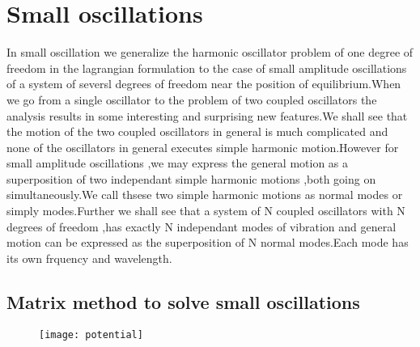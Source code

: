 \section{Small oscillations}
In small oscillation we generalize the harmonic oscillator problem of one degree of freedom in the lagrangian formulation to the case of small amplitude oscillations of a system of seversl degrees of freedom near the position of equilibrium.When we go from a single oscillator to the problem of two coupled oscillators the analysis results in some interesting and surprising new features.We shall see that the motion of the two coupled oscillators in general is much complicated and none of the oscillators in general executes simple harmonic motion.However for small amplitude oscillations ,we may express the general motion as a superposition of two independant simple harmonic motions ,both going on simultaneously.We call thsese two simple harmonic motions as normal modes or simply modes.Further we shall see that a system of N coupled oscillators with N degrees of freedom ,has exactly N independant modes of vibration and general motion can be expressed as the superposition of N normal modes.Each mode has its own frquency and wavelength.
\subsection{Matrix method to solve small oscillations}
\begin{figure}[H]
	\centering
	\texttt{[image: potential]}
	\caption{}
	\label{}
\end{figure}